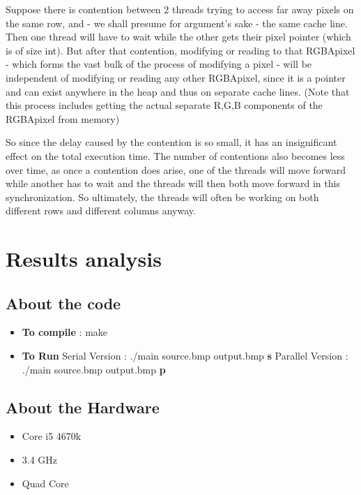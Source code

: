 \documentclass[paper=a4, fontsize=11pt]{scrartcl} %
\numberwithin{equation}{section} %
\numberwithin{figure}{section} %
\numberwithin{table}{section} %
\begin{document}
Suppose there is contention between 2 threads trying to access far away pixels on the same row, and - we shall presume for argument's sake - the same cache line. Then one thread will have to wait while the other gets their pixel pointer (which is of size int). But after that contention, modifying or reading to that RGBApixel - which forms the vast bulk of the process of modifying a pixel - will be independent of modifying or reading any other RGBApixel, since it is a pointer and can exist anywhere in the heap and thus on separate cache lines. (Note that this process includes getting the actual separate R,G,B components of the RGBApixel from memory)


So since the delay caused by the contention is so small, it has an insignificant effect on the total execution time. The number of contentions also becomes less over time, as once a contention does arise, one of the threads will move forward while another has to wait and the threads will then both move forward in this synchronization. So ultimately, the threads will often be working on both different rows and different columns anyway.


\section{Results analysis}

\subsection{About the code}
\begin{itemize}

\item \textbf{To compile}  : make
\item \textbf{To Run}
	\subitem Serial Version : ./main source.bmp output.bmp \textbf{s}  
	\subitem Parallel Version : ./main source.bmp output.bmp \textbf{p}
	
\end{itemize}

\subsection{About the Hardware}

\begin{itemize}
\item{Core i5 4670k}
\item{3.4 GHz}
\item{Quad Core}
\end{itemize}
\end{document}
